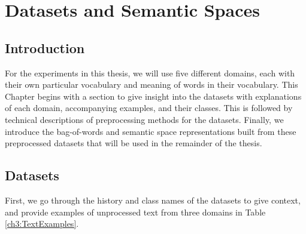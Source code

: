 \chapter{Datasets and Semantic Spaces}\label{ch2.5}


\section{Introduction}\label{chapter3:datasets}


For the experiments in this thesis, we will use  five different domains, each with their own particular vocabulary and meaning of words in their vocabulary. %
 This Chapter begins with a section to give insight into the datasets with explanations of each domain, accompanying examples, and their classes. This is followed by technical descriptions of preprocessing methods for the datasets. Finally, we introduce the bag-of-words and semantic space representations built from these preprocessed datasets that will be used in the remainder of the thesis.

\section{Datasets}\label{data:datasets}

First, we go through the history and class names of the datasets to give context, and provide examples of unprocessed text from three domains in Table \ref{ch3:TextExamples}. 

